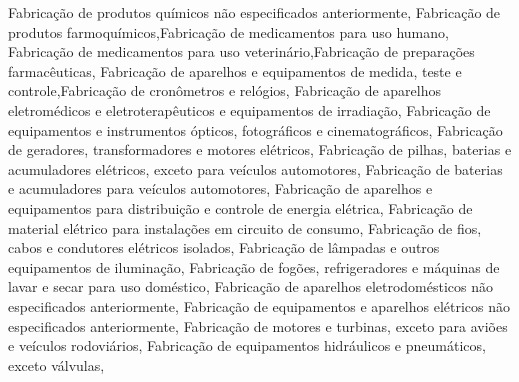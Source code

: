 \documentclass[
  12,
  dvipsnames]{article}
\newenvironment{Shaded}{\begin{snugshade}}{\end{snugshade}}
\newcommand{\NormalTok}[1]{#1}
\newcommand{\StringTok}[1]{\textcolor[rgb]{0.31,0.60,0.02}{#1}}
\begin{document}
\begin{Shaded}
\begin{Highlighting}[]
    \StringTok{\textquotesingle{}Fabricação de produtos químicos não especificados anteriormente\textquotesingle{}}\NormalTok{,}
    \StringTok{\textquotesingle{}Fabricação de produtos farmoquímicos\textquotesingle{}}\NormalTok{,}\StringTok{\textquotesingle{}Fabricação de medicamentos para uso humano\textquotesingle{}}\NormalTok{,}
    \StringTok{\textquotesingle{}Fabricação de medicamentos para uso veterinário\textquotesingle{}}\NormalTok{,}\StringTok{\textquotesingle{}Fabricação de preparações farmacêuticas\textquotesingle{}}\NormalTok{,}
    \StringTok{\textquotesingle{}Fabricação de aparelhos e equipamentos de medida, teste e controle\textquotesingle{}}\NormalTok{,}\StringTok{\textquotesingle{}Fabricação de cronômetros e relógios\textquotesingle{}}\NormalTok{,}
    \StringTok{\textquotesingle{}Fabricação de aparelhos eletromédicos e eletroterapêuticos e equipamentos de irradiação\textquotesingle{}}\NormalTok{,}
    \StringTok{\textquotesingle{}Fabricação de equipamentos e instrumentos ópticos, fotográficos e cinematográficos\textquotesingle{}}\NormalTok{,}
    \StringTok{\textquotesingle{}Fabricação de geradores, transformadores e motores elétricos\textquotesingle{}}\NormalTok{,}
    \StringTok{\textquotesingle{}Fabricação de pilhas, baterias e acumuladores elétricos, exceto para veículos automotores\textquotesingle{}}\NormalTok{,}
    \StringTok{\textquotesingle{}Fabricação de baterias e acumuladores para veículos automotores\textquotesingle{}}\NormalTok{,}
    \StringTok{\textquotesingle{}Fabricação de aparelhos e equipamentos para distribuição e controle de energia elétrica\textquotesingle{}}\NormalTok{,}
    \StringTok{\textquotesingle{}Fabricação de material elétrico para instalações em circuito de consumo\textquotesingle{}}\NormalTok{,}
    \StringTok{\textquotesingle{}Fabricação de fios, cabos e condutores elétricos isolados\textquotesingle{}}\NormalTok{,}
    \StringTok{\textquotesingle{}Fabricação de lâmpadas e outros equipamentos de iluminação\textquotesingle{}}\NormalTok{,}
    \StringTok{\textquotesingle{}Fabricação de fogões, refrigeradores e máquinas de lavar e secar para uso doméstico\textquotesingle{}}\NormalTok{,}
    \StringTok{\textquotesingle{}Fabricação de aparelhos eletrodomésticos não especificados anteriormente\textquotesingle{}}\NormalTok{,}
    \StringTok{\textquotesingle{}Fabricação de equipamentos e aparelhos elétricos não especificados anteriormente\textquotesingle{}}\NormalTok{,}
    \StringTok{\textquotesingle{}Fabricação de motores e turbinas, exceto para aviões e veículos rodoviários\textquotesingle{}}\NormalTok{,}
    \StringTok{\textquotesingle{}Fabricação de equipamentos hidráulicos e pneumáticos, exceto válvulas\textquotesingle{}}\NormalTok{,}

\end{Highlighting}
\end{Shaded}
\end{document}
